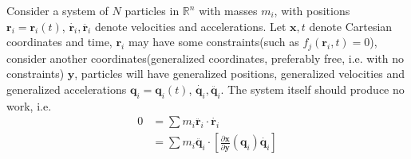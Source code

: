 \documentclass[main]{subfiles}
\begin{document}
Consider a system of $N$ particles in $\mathbb R^n$ with masses $m_i$, with positions $\mathbf r_i=\mathbf r_i(t)$, $\dot{\mathbf r_i},\ddot{\mathbf r_i}$ denote velocities and accelerations. Let $\mathbf x,t$ denote Cartesian coordinates and time, $\mathbf r_i$ may have some constraints(such as $f_j(\mathbf r_i,t)=0$), consider another coordinates(generalized coordinates, preferably free, i.e. with no constraints) $\mathbf y$, particles will have generalized positions, generalized velocities and generalized accelerations $\mathbf q_i=\mathbf q_i(t)$, $\dot{\mathbf q_i},\ddot{\mathbf q_i}$. The system itself should produce no work, i.e.
\begin{align*}
0&=\sum m_i\ddot{\mathbf r_i}\cdot\dot{\mathbf r_i} \\
&=\sum m_i\ddot{\mathbf q_i}\cdot\left[\frac{\partial\mathbf x}{\partial\mathbf y}(\mathbf q_i)\dot{\mathbf q_i}\right] \\
\end{align*}

\begin{example}

\end{example}

\begin{definition}

\end{definition}
\end{document}
